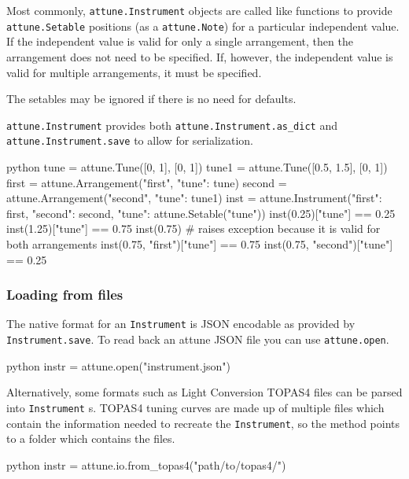 Most commonly, \texttt{attune.Instrument} objects are
called like functions to provide
\texttt{attune.Setable} positions (as a
\texttt{attune.Note}) for a particular independent
value. If the independent value is valid for only a single arrangement,
then the arrangement does not need to be specified. If, however, the
independent value is valid for multiple arrangements, it must be
specified.

The setables may be ignored if there is no need for defaults.

\texttt{attune.Instrument} provides both
\texttt{attune.Instrument.as\_dict} and
\texttt{attune.Instrument.save} to allow for
serialization.

\begin{codefragment}{python}
tune = attune.Tune([0, 1], [0, 1])
tune1 = attune.Tune([0.5, 1.5], [0, 1])
first = attune.Arrangement("first", {"tune": tune})
second = attune.Arrangement("second", {"tune": tune1})
inst = attune.Instrument({"first": first, "second": second}, {"tune": attune.Setable("tune")})
inst(0.25)["tune"] == 0.25
inst(1.25)["tune"] == 0.75
inst(0.75) # raises exception because it is valid for both arrangements
inst(0.75, "first")["tune"] == 0.75
inst(0.75, "second")["tune"] == 0.25
\end{codefragment}

\hypertarget{loading-from-files}{%
\subsubsection{Loading from files}\label{loading-from-files}}

The native format for an \texttt{Instrument} is
JSON encodable as provided by
\texttt{Instrument.save}. To read back an attune
JSON file you can use \texttt{attune.open}.

\begin{codefragment}{python}
instr = attune.open("instrument.json")
\end{codefragment}

Alternatively, some formats such as Light Conversion TOPAS4 files can be
parsed into \texttt{Instrument} s. TOPAS4
tuning curves are made up of multiple files which contain the
information needed to recreate the
\texttt{Instrument}, so the method points to a
folder which contains the files.

\begin{codefragment}{python}
instr = attune.io.from_topas4("path/to/topas4/")
\end{codefragment}

